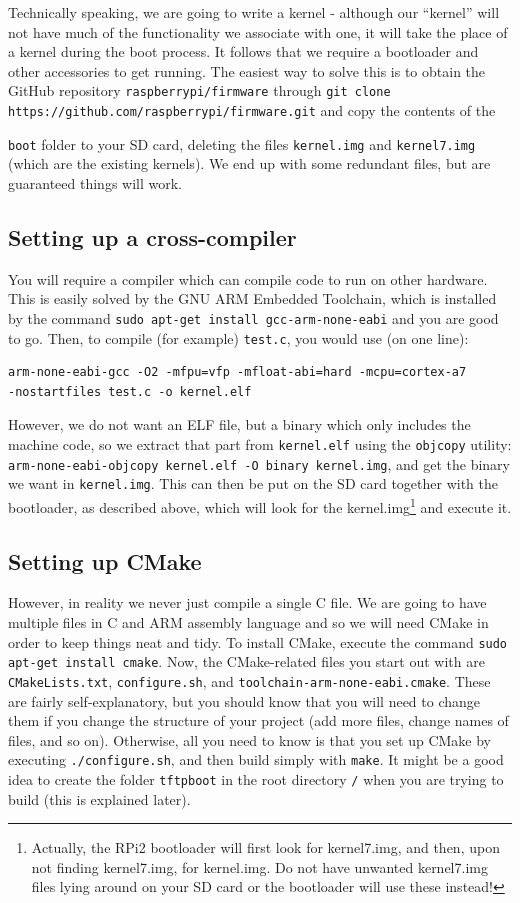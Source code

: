 \documentclass[a4paper,11pt,reqno]{amsart}
\begin{document}
Technically speaking, we are going to write a kernel - although our ``kernel'' will not have much of the functionality we associate with one, it will take the place of a kernel during the boot process. It follows that we require a bootloader and other accessories to get running. The easiest way to solve this is to obtain the GitHub repository \texttt{raspberrypi/firmware} through \texttt{git clone https://github.com/raspberrypi/firmware.git} and copy the contents of the {\texttt{boot} folder to your SD card, deleting the files \texttt{kernel.img} and \texttt{kernel7.img} (which are the existing kernels). We end up with some redundant files, but are guaranteed things will work.

\subsection{Setting up a cross-compiler}
You will require a compiler which can compile code to run on other hardware. This is easily solved by the GNU ARM Embedded Toolchain, which is installed by the command \texttt{sudo apt-get install gcc-arm-none-eabi} and you are good to go. Then, to compile (for example) \texttt{test.c}, you would use (on one line):

\begin{verbatim}
arm-none-eabi-gcc -O2 -mfpu=vfp -mfloat-abi=hard -mcpu=cortex-a7 
-nostartfiles test.c -o kernel.elf
\end{verbatim}

However, we do not want an ELF file, but a binary which only includes the machine code, so we extract that part from \texttt{kernel.elf} using the \texttt{objcopy} utility: \texttt{arm-none-eabi-objcopy kernel.elf -O binary kernel.img}, and get the binary we want in \texttt{kernel.img}. This can then be put on the SD card together with the bootloader, as described above, which will look for the kernel.img\footnote{Actually, the RPi2 bootloader will first look for kernel7.img, and then, upon not finding kernel7.img, for kernel.img. Do not have unwanted kernel7.img files lying around on your SD card or the bootloader will use these instead!} and execute it.

\subsection{Setting up CMake}
However, in reality we never just compile a single C file. We are going to have multiple files in C and ARM assembly language and so we will need CMake in order to keep things neat and tidy. To install CMake, execute the command \texttt{sudo apt-get install cmake}. Now, the CMake-related files you start out with are \texttt{CMakeLists.txt}, \texttt{configure.sh}, and \texttt{toolchain-arm-none-eabi.cmake}. These are fairly self-explanatory, but you should know that you will need to change them if you change the structure of your project (add more files, change names of files, and so on). Otherwise, all you need to know is that you set up CMake by executing \texttt{./configure.sh}, and then build simply with \texttt{make}. It might be a good idea to create the folder \texttt{tftpboot} in the root directory \texttt{/} when you are trying to build (this is explained later).

}
\end{document}
